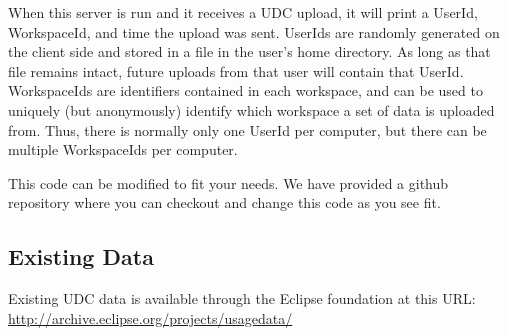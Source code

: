 \noindent
When this server is run and it receives a UDC upload,
it will print a UserId, WorkspaceId, and time the upload was sent.
UserIds are randomly generated on the client side and stored in a file in
the user's home directory.
As long as that file remains intact, future uploads from that user will
contain that UserId.
WorkspaceIds are identifiers contained in each workspace, and can be
used to uniquely (but anonymously) identify which
workspace a set of data is uploaded from.
Thus, there is normally only one UserId per computer, but there can
be multiple WorkspaceIds per computer.

This code can be modified to fit your needs.
We have provided a github repository where you can checkout
and change this code as you see fit.





\subsection{Existing Data}

Existing UDC data is available through the Eclipse foundation at this URL:
\url{http://archive.eclipse.org/projects/usagedata/}

